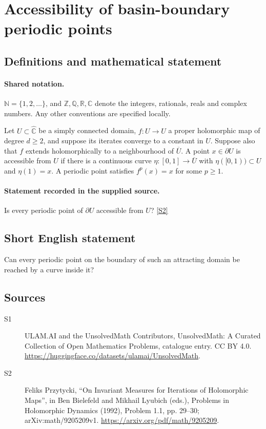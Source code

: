 \documentclass[11pt]{article}
\newcommand{\sref}[2]{\hyperlink{source:#1:#2}{[S#2]}}
\begin{document}
\section{Accessibility of basin-boundary periodic points}\label{statement}

\subsection{Definitions and mathematical statement}

\paragraph{Shared notation.}$\mathbb N=\{1,2,\ldots\}$, and $\mathbb Z,\mathbb Q,\mathbb R,\mathbb C$ denote the integers, rationals, reals and complex numbers. Any other conventions are specified locally.


Let $U\subset\widehat{\mathbb C}$ be a simply connected domain, $f:U\to U$ a proper holomorphic map of degree $d\geq2$, and suppose its iterates converge to a constant in $U$. Suppose also that $f$ extends holomorphically to a neighbourhood of $\overline U$. A point $x\in\partial U$ is accessible from $U$ if there is a continuous curve $\eta:[0,1]\to\overline U$ with $\eta([0,1))\subset U$ and $\eta(1)=x$. A periodic point satisfies $f^p(x)=x$ for some $p\geq1$.
\paragraph{Statement recorded in the supplied source.}
Is every periodic point of $\partial U$ accessible from $U$? \sref{statement}{2}
\subsection{Short English statement}
Can every periodic point on the boundary of such an attracting domain be reached by a curve inside it?
\subsection{Sources}
\begin{description}
\item[\hypertarget{source:statement:1}{S1}] ULAM.AI and the UnsolvedMath Contributors, UnsolvedMath: A Curated Collection of Open Mathematics Problems, catalogue entry. CC BY 4.0. \url{https://huggingface.co/datasets/ulamai/UnsolvedMath}.
\item[\hypertarget{source:statement:2}{S2}] Feliks Przytycki, ``On Invariant Measures for Iterations of Holomorphic Maps'', in Ben Bielefeld and Mikhail Lyubich (eds.), Problems in Holomorphic Dynamics (1992), Problem 1.1, pp. 29--30; arXiv:math/9205209v1. \url{https://arxiv.org/pdf/math/9205209}.
\end{description}
\label{end:statement}
\end{document}
